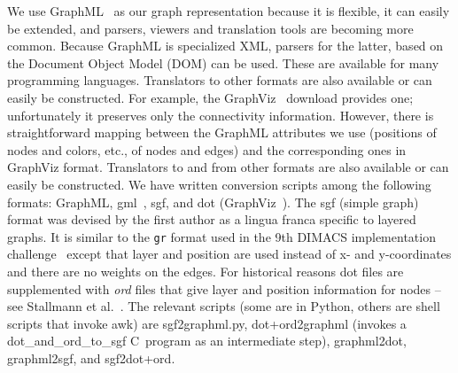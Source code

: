 We use GraphML~\cite{GraphML} as our graph representation because it is flexible, it can
easily be extended, and parsers, viewers and translation tools are becoming
more common.
Because GraphML is
specialized XML, parsers for the latter, based on the Document Object Model
(DOM) can be used. These are available for many programming languages.
Translators to other formats are also available or can easily be constructed.
For example, the GraphViz~\cite{GraphViz} download provides one;
unfortunately it preserves
only
the connectivity information.
However, there is straightforward mapping between the GraphML attributes we
use (positions of nodes and colors, etc., of nodes and edges) and the
corresponding ones in GraphViz format.
Translators to and from other formats are also available or can easily be constructed.
We have written conversion scripts among the following formats:
GraphML, gml~\cite{1999-TRPassau-Himsolt}, sgf, and dot (GraphViz~\cite{GraphViz}).
The sgf (simple graph) format was devised by the first author as a
lingua franca specific to layered graphs.
It is similar to the \texttt{gr} format used in the 9th DIMACS implementation
challenge~\cite{2006-DIMACS-Implementation}
except that layer and position are used instead of x- and y-coordinates
and
there are no weights on the edges.
For historical reasons dot files are supplemented with \emph{ord} files
that give layer and position information for nodes
-- see Stallmann et al.~\cite{2001-JEA-Stallmann}.
The relevant scripts (some are in Python, others are shell scripts that invoke
awk) are sgf2graphml.py, dot+ord2graphml (invokes a dot\_and\_ord\_to\_sgf
C~program as an intermediate step), graphml2dot, graphml2sgf, and
sgf2dot+ord.

